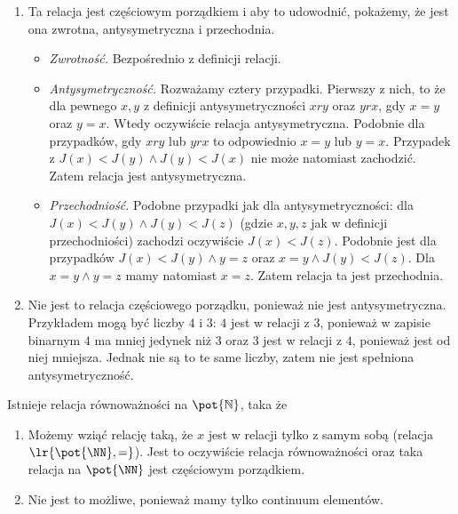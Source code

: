 \begin{solutions}
\begin{enumerate}[\bf A.]
        \item Ta relacja jest częściowym porządkiem i aby to udowodnić, pokażemy, że jest ona zwrotna, antysymetryczna i przechodnia.
        \begin{itemize}
            \item \textit{Zwrotność.} Bezpośrednio z definicji relacji.
            \item \textit{Antysymetryczność.} Rozważamy cztery przypadki. Pierwszy z nich, to że dla pewnego $x, y$ z definicji antysymetryczności $x r y$ oraz $y r x$, gdy $x=y$ oraz $y=x$. Wtedy oczywiście relacja antysymetryczna. Podobnie dla przypadków, gdy $x r y$ lub $y r x$ to odpowiednio $x=y$ lub $y=x$. Przypadek z $J(x) < J(y) \land J(y) < J(x)$ nie może natomiast zachodzić. Zatem relacja jest antysymetryczna.
            \item \textit{Przechodniość.} Podobne przypadki jak dla antysymetryczności: dla $J(x) < J(y) \wedge J(y) < J(z)$ (gdzie $x, y, z$ jak w definicji przechodniości) zachodzi oczywiście $J(x) < J(z)$. Podobnie jest dla przypadków $J(x) < J(y) \wedge y=z$ oraz $x=y \wedge J(y) < J(z)$. Dla $x=y \wedge y=z$ mamy natomiast $x=z$. Zatem relacja ta jest przechodnia.
        \end{itemize}
        
        \item Nie jest to relacja częściowego porządku, ponieważ nie jest antysymetryczna. Przykładem mogą być liczby $4$ i $3$: $4$ jest w relacji z $3$, ponieważ w zapisie binarnym $4$ ma mniej jedynek niż $3$ oraz $3$ jest w relacji z $4$, ponieważ jest od niej mniejsza. Jednak nie są to te same liczby, zatem nie jest spełniona antysymetryczność.
    \end{enumerate}

    \sol Istnieje relacja równoważności na $\pot{\mathbb{N}}$, taka że

    \begin{enumerate}[\bf A.]
        \item Możemy wziąć relację taką, że $x$ jest w relacji tylko z samym sobą (relacja $\lr{\pot{\NN}, =}$). Jest to oczywiście relacja równoważności oraz taka relacja na $\pot{\NN}$ jest częściowym porządkiem.

        \item Nie jest to możliwe, ponieważ mamy tylko continuum elementów.


\end{enumerate}
\end{solutions}
